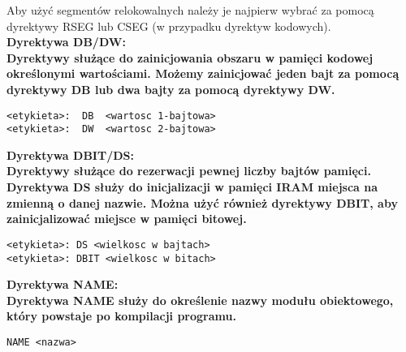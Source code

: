 \documentclass[a4paper,12pt]{article}
\newcommand{\h}[1]{\noindent \bf #1 \rm \\ \noindent}
\begin{document}
\noindent
Aby użyć segmentów relokowalnych należy je najpierw wybrać za pomocą dyrektywy RSEG lub CSEG (w przypadku dyrektyw kodowych).\\

\h{Dyrektywa DB/DW:}
Dyrektywy służące do zainicjowania obszaru w pamięci kodowej określonymi wartościami. Możemy zainicjować jeden bajt za pomocą dyrektywy DB lub dwa bajty za pomocą dyrektywy DW.
\begin{lstlisting}[language={[x86masm]Assembler}]
<etykieta>:  DB  <wartosc 1-bajtowa>
<etykieta>:  DW  <wartosc 2-bajtowa>
\end{lstlisting}
\vspace{5mm}

\h{Dyrektywa DBIT/DS:}
Dyrektywy służące do rezerwacji pewnej liczby bajtów pamięci. Dyrektywa DS służy do inicjalizacji w pamięci IRAM miejsca na zmienną o danej nazwie. Można użyć również dyrektywy DBIT, aby zainicjalizować miejsce w pamięci bitowej.
\begin{lstlisting}[language={[x86masm]Assembler}]
<etykieta>: DS <wielkosc w bajtach>
<etykieta>: DBIT <wielkosc w bitach>
\end{lstlisting}
\vspace{5mm}

\h{Dyrektywa NAME:}
Dyrektywa NAME służy do określenie nazwy modułu obiektowego, który powstaje po kompilacji programu.
\begin{lstlisting}[language={[x86masm]Assembler}]
NAME <nazwa>
\end{lstlisting}
\end{document}

